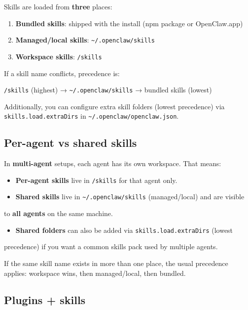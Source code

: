 Skills are loaded from \textbf{three} places:

\begin{enumerate}
  \item \textbf{Bundled skills}: shipped with the install (npm package or OpenClaw.app)
  \item \textbf{Managed/local skills}: \texttt{\textasciitilde{}/.openclaw/skills}
  \item \textbf{Workspace skills}: \texttt{/skills}
\end{enumerate}


If a skill name conflicts, precedence is:

\texttt{/skills} (highest) → \texttt{\textasciitilde{}/.openclaw/skills} → bundled skills (lowest)

Additionally, you can configure extra skill folders (lowest precedence) via
\texttt{skills.load.extraDirs} in \texttt{\textasciitilde{}/.openclaw/openclaw.json}.

\subsection{Per-agent vs shared skills}


In \textbf{multi-agent} setups, each agent has its own workspace. That means:

\begin{itemize}
  \item \textbf{Per-agent skills} live in \texttt{/skills} for that agent only.
  \item \textbf{Shared skills} live in \texttt{\textasciitilde{}/.openclaw/skills} (managed/local) and are visible
\end{itemize}

to \textbf{all agents} on the same machine.
\begin{itemize}
  \item \textbf{Shared folders} can also be added via \texttt{skills.load.extraDirs} (lowest
\end{itemize}

precedence) if you want a common skills pack used by multiple agents.

If the same skill name exists in more than one place, the usual precedence
applies: workspace wins, then managed/local, then bundled.

\subsection{Plugins + skills}


